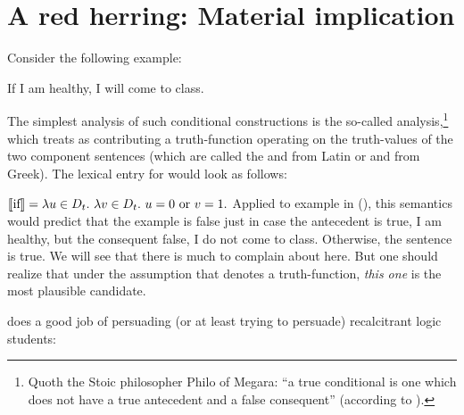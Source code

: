 \section{A red herring: Material implication}

Consider the following example:

\ex If I am healthy, I will come to class. \xe

The simplest analysis of such conditional constructions is the so-called
 analysis,\footnote{Quoth the Stoic philosopher Philo
  of Megara: ``a true conditional is one which does not have a true antecedent
  and a false consequent'' (according to \citet[II,
  110--112]{sextus-empiricus:200:outlines}).} which treats  as
contributing a truth-function operating on the truth-values of the two component
sentences (which are called the  and  \dash
from Latin \dash or  and  \dash from Greek). The
lexical entry for  would look as follows:

\ex\label{ex:material} $\llbracket \mbox{if} \rrbracket
= \lambda u \in D_t.\ \lambda v \in D_t.\ u=0 \mbox{ or } v=1.$ \xe
%
Applied to example in (\blastx), this semantics would predict that the example
is false just in case the antecedent is true, I am healthy, but the consequent
false, I do not come to class. Otherwise, the sentence is true. We will see that
there is much to complain about here. But one should realize that under the
assumption that  denotes a truth-function, \emph{this one} is the
most plausible candidate.

\citet{suber:1997:material} does a good job of persuading (or at least trying to
persuade) recalcitrant logic students:

